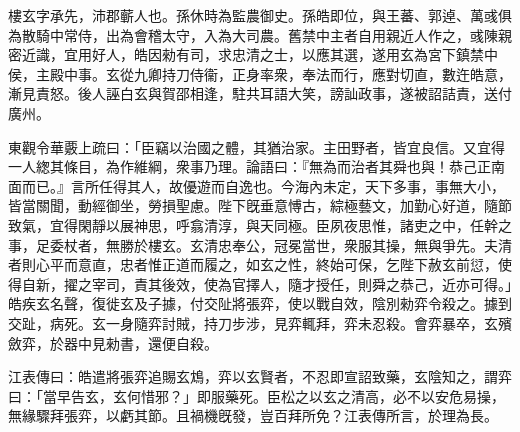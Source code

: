 
\begin{pinyinscope}
樓玄字承先，沛郡蘄人也。孫休時為監農御史。孫皓即位，與王蕃、郭逴、萬彧俱為散騎中常侍，出為會稽太守，入為大司農。舊禁中主者自用親近人作之，彧陳親密近識，宜用好人，皓因勑有司，求忠清之士，以應其選，遂用玄為宮下鎮禁中侯，主殿中事。玄從九卿持刀侍衞，正身率衆，奉法而行，應對切直，數迕皓意，漸見責怒。後人誣白玄與賀邵相逢，駐共耳語大笑，謗訕政事，遂被詔詰責，送付廣州。

東觀令華覈上疏曰：「臣竊以治國之體，其猶治家。主田野者，皆宜良信。又宜得一人緫其條目，為作維綱，衆事乃理。論語曰：『無為而治者其舜也與！恭己正南面而已。』言所任得其人，故優遊而自逸也。今海內未定，天下多事，事無大小，皆當關聞，動經御坐，勞損聖慮。陛下旣垂意愽古，綜極藝文，加勤心好道，隨節致氣，宜得閑靜以展神思，呼翕清淳，與天同極。臣夙夜思惟，諸吏之中，任幹之事，足委杖者，無勝於樓玄。玄清忠奉公，冠冕當世，衆服其操，無與爭先。夫清者則心平而意直，忠者惟正道而履之，如玄之性，終始可保，乞陛下赦玄前愆，使得自新，擢之宰司，責其後效，使為官擇人，隨才授任，則舜之恭己，近亦可得。」皓疾玄名聲，復徙玄及子據，付交阯將張弈，使以戰自效，陰別勑弈令殺之。據到交趾，病死。玄一身隨弈討賊，持刀步涉，見弈輒拜，弈未忍殺。會弈暴卒，玄殯斂弈，於器中見勑書，還便自殺。

江表傳曰：皓遣將張弈追賜玄鴆，弈以玄賢者，不忍即宣詔致藥，玄陰知之，謂弈曰：「當早告玄，玄何惜邪？」即服藥死。臣松之以玄之清高，必不以安危易操，無緣驟拜張弈，以虧其節。且禍機旣發，豈百拜所免？江表傳所言，於理為長。


\end{pinyinscope}